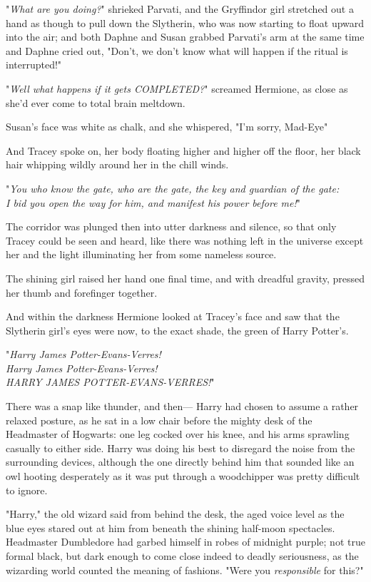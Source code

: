"\emph{What are you doing?}" shrieked Parvati, and the Gryffindor girl
stretched out a hand as though to pull down the Slytherin, who was now starting
to float upward into the air; and both Daphne and Susan grabbed Parvati's arm
at the same time and Daphne cried out, "Don't, we don't know what will happen
if the ritual is interrupted!"

"\emph{Well what happens if it gets COMPLETED?}" screamed Hermione, as close as
she'd ever come to total brain meltdown.

Susan's face was white as chalk, and she whispered, "I'm sorry, Mad-Eye{\el}"

And Tracey spoke on, her body floating higher and higher off the floor, her
black hair whipping wildly around her in the chill winds.

"\emph{You who know the gate, who are the gate, the key and guardian of the
gate:\\
I bid you open the way for him, and manifest his power before me!}"

The corridor was plunged then into utter darkness and silence, so that only
Tracey could be seen and heard, like there was nothing left in the universe
except her and the light illuminating her from some nameless source.

The shining girl raised her hand one final time, and with dreadful gravity,
pressed her thumb and forefinger together.

And within the darkness Hermione looked at Tracey's face and saw that the
Slytherin girl's eyes were now, to the exact shade, the green of Harry Potter's.

"\emph{Harry James Potter-Evans-Verres!\\
Harry James Potter-Evans-Verres!\\
HARRY JAMES POTTER-EVANS-VERRES!}"

There was a snap like thunder, and then---
\sbreak
Harry had chosen to assume a rather relaxed posture, as he sat in a low chair
before the mighty desk of the Headmaster of Hogwarts: one leg cocked over his
knee, and his arms sprawling casually to either side. Harry was doing his best
to disregard the noise from the surrounding devices, although the one directly
behind him that sounded like an owl hooting desperately as it was put through a
woodchipper was pretty difficult to ignore.

"Harry," the old wizard said from behind the desk, the aged voice level as the
blue eyes stared out at him from beneath the shining half-moon spectacles.
Headmaster Dumbledore had garbed himself in robes of midnight purple; not true
formal black, but dark enough to come close indeed to deadly seriousness, as
the wizarding world counted the meaning of fashions. "Were you{\el}
\emph{responsible} for this?"

